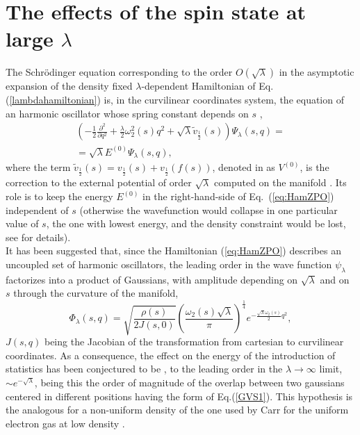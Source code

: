 \documentclass[aps,pra,twocolumn,superscriptaddress]{revtex4}
\begin{document}

\section{The effects of the spin state at large $\lambda$}
\label{sec:modelfermion}
The Schr\"odinger equation corresponding to the order $O(\sqrt{\lambda})$ in the asymptotic expansion of the density fixed $\lambda$-dependent Hamiltonian of Eq.(\ref{lambdahamiltonian}) is, in the curvilinear coordinates system, the equation of an harmonic oscillator whose spring constant depends on $s$ \citep{GorVigSei-JCTC-09},
\begin{multline}
\left(-\frac{1}{2}\frac{\partial^2}{\partial q^2}+\frac{\lambda}{2}\omega_2^2(s)q^2+\sqrt{\lambda}\tilde{v}_{\frac{1}{2}}(s)\right)\Psi_{\lambda}(s,q)= \\ =\sqrt{\lambda}E^{(0)}\Psi_{\lambda}(s,q),
\label{eq:HamZPO}
\end{multline}
where the term $\tilde{v}_{\frac{1}{2}}(s)=v_{\frac{1}{2}}(s)+v_{\frac{1}{2}}(f(s))$, denoted in \citep{GorVigSei-JCTC-09} as $V^{(0)}$, is the correction to the external potential of order $\sqrt{\lambda}$ computed on the manifold \citep{GorVigSei-JCTC-09}. Its role is to keep the energy $E^{(0)}$ in the right-hand-side of Eq.~(\ref{eq:HamZPO}) independent of $s$ (otherwise the wavefunction would collapse in one particular value of $s$, the one with lowest energy, and the density constraint would be lost, see \citep{GorVigSei-JCTC-09} for details).\\
It has been suggested \citep{GorVigSei-JCTC-09} that, since the Hamiltonian (\ref{eq:HamZPO}) describes an uncoupled set of harmonic oscillators, the leading order in the wave function $\psi_{\lambda}$ factorizes into a product of Gaussians, with amplitude depending on $\sqrt{\lambda}$ and on $s$ through the curvature of the manifold, 
\begin{equation}\label{GVS1}
\Phi_{\lambda}\left(s,q\right)=\sqrt{\frac{\rho(s)}{2J(s,0)}}\left(\frac{\omega_2(s)\sqrt{\lambda}}{\pi}\right)^{\frac{1}{4}}e^{-\frac{\sqrt{\lambda}\omega_2(s)}{2}q^2},
\end{equation}
$J(s,q)$ being the Jacobian of the transformation from cartesian to curvilinear coordinates.
As a consequence, the effect on the energy of the introduction of statistics has been conjectured to be \cite{GorSeiVig-PRL-09,GorVigSei-JCTC-09}, to the leading order in the $\lambda\rightarrow\infty$ limit, $\sim e^{-\sqrt{\lambda}}$, being this the order of magnitude of the overlap between two gaussians centered in different positions having the form of Eq.(\ref{GVS1}). This hypothesis is the analogous for a non-uniform density of the one used by Carr for the uniform electron gas at low density \cite{Car-PR-61}.\\
\end{document}
